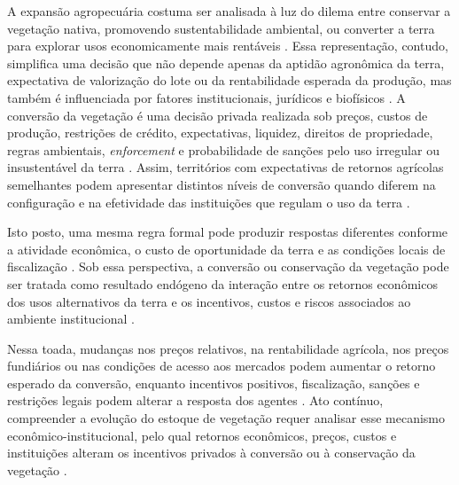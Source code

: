 A expansão agropecuária costuma ser analisada à luz do dilema entre conservar a vegetação nativa, promovendo sustentabilidade ambiental, ou converter a terra para explorar usos economicamente mais rentáveis \cite{Angelsen2010}. Essa representação, contudo, simplifica uma decisão que não depende apenas da aptidão agronômica da terra, expectativa de valorização do lote ou da rentabilidade esperada da produção, mas também é influenciada por fatores institucionais, jurídicos e biofísicos \cite{LubowskiEtAl2008}. A conversão da vegetação é uma decisão privada realizada sob preços, custos de produção, restrições de crédito, expectativas, liquidez, direitos de propriedade, regras ambientais, \textit{enforcement} e probabilidade de sanções pelo uso irregular ou insustentável da terra \cite{JungEtAl2022}. Assim, territórios com expectativas de retornos agrícolas semelhantes podem apresentar distintos níveis de conversão quando diferem na configuração e na efetividade das instituições que regulam o uso da terra \cite{alstonTitlesConflictLand1999}.

Isto posto, uma mesma regra formal pode produzir respostas diferentes conforme a atividade econômica, o custo de oportunidade da terra e as condições locais de fiscalização \cite{AssuncaoEtAl2023}. Sob essa perspectiva, a conversão ou conservação da vegetação pode ser tratada como resultado endógeno da interação entre os retornos econômicos dos usos alternativos da terra e os incentivos, custos e riscos associados ao ambiente institucional \cite{Braganca2018}.

Nessa toada, mudanças nos preços relativos, na rentabilidade agrícola, nos preços fundiários ou nas condições de acesso aos mercados podem aumentar o retorno esperado da conversão, enquanto incentivos positivos, fiscalização, sanções e restrições legais podem alterar a resposta dos agentes \cite{HardingEtAl2021}. Ato contínuo, compreender a evolução do estoque de vegetação requer analisar esse mecanismo econômico-institucional, pelo qual retornos econômicos, preços, custos e instituições alteram os incentivos privados à conversão ou à conservação da vegetação \cite{Braganca2018}.

